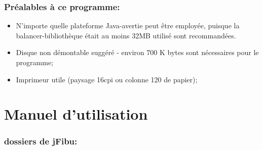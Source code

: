\documentclass[12pt]{report}
\begin{document}
\subsection{ Préalables à ce programme:
}



\begin{itemize}
\item N'importe quelle plateforme Java-avertie peut être employée, puisque la balancer-bibliothèque était au moins 32MB utilisé sont recommandées.



\item Disque non démontable suggéré - environ 700 K bytes sont nécessaires pour le programme;



\item Imprimeur utile (paysage 16cpi ou colonne 120 de papier);



\end{itemize}

\chapter{Manuel d'utilisation}



\subsection{ dossiers de jFibu:}
\end{document}
